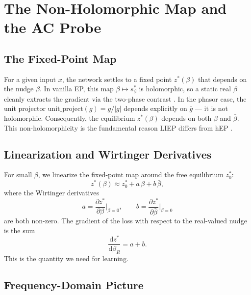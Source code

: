 \documentclass[11pt]{article}
\newcommand{\dd}{\mathrm{d}}
\newcommand{\unitproject}{\mathrm{unit\_project}}
\begin{document}
\section{The Non-Holomorphic Map and the AC Probe}\label{sec:problem}

\subsection{The Fixed-Point Map}\label{ssec:fixed-point-map}

For a given input $x$, the network settles to a fixed point $z^*(\beta)$ that depends on the nudge $\beta$. In vanilla EP, this map $\beta \mapsto s_\beta^*$ is holomorphic, so a static real $\beta$ cleanly extracts the gradient via the two-phase contrast \citep{scellier2017equilibrium}. In the phasor case, the unit projector $\unitproject(g) = g/|g|$ depends explicitly on $\bar{g}$ --- it is not holomorphic. Consequently, the equilibrium $z^*(\beta)$ depends on both $\beta$ and $\bar{\beta}$. This non-holomorphicity is the fundamental reason LIEP differs from hEP \citep{laborieux2022holomorphic}.

\subsection{Linearization and Wirtinger Derivatives}\label{ssec:linearization}

For small $\beta$, we linearize the fixed-point map around the free equilibrium $z_0^*$:
\begin{equation}
z^*(\beta) \approx z_0^* + a\,\beta + b\,\bar{\beta},
\end{equation}
where the Wirtinger derivatives
\begin{equation}
a = \frac{\partial z^*}{\partial \beta}\Big|_{\beta=0},
\qquad
b = \frac{\partial z^*}{\partial \bar{\beta}}\Big|_{\beta=0}
\end{equation}
are both non-zero. The gradient of the loss with respect to the real-valued nudge is the sum
\begin{equation}
\frac{\dd z^*}{\dd \beta_R} = a + b.
\end{equation}
This is the quantity we need for learning.

\subsection{Frequency-Domain Picture}\label{ssec:frequency-picture}
\end{document}
